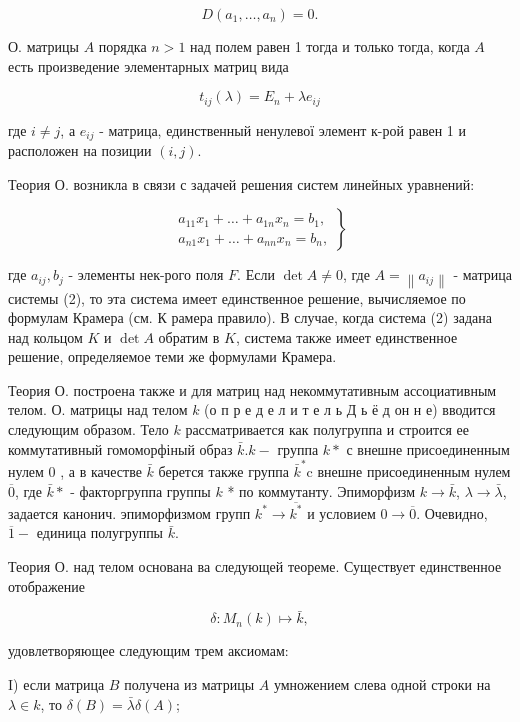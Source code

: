 \documentclass[10pt]{article}
\begin{document}
\[
D\left(a_{1}, \ldots, a_{n}\right)=0 .
\]

О. матрицы $A$ порядка $n>1$ над полем равен 1 тогда и только тогда, когда $A$ есть произведение элементарных матриц вида

\[
t_{i j}(\lambda)=E_{n}+\lambda e_{i j}
\]

где $i \neq j$, а $e_{i j}$ - матрица, единственный ненулевої элемент к-рой равен 1 и расположен на позиции $(i, j)$.

Теория О. возникла в связи с задачей решения систем линейных уравнений:

\[
\left.\begin{array}{c}
a_{11} x_{1}+\ldots+a_{1 n} x_{n}=b_{1}, \\
a_{n 1} x_{1}+\ldots+a_{n n} x_{n}=b_{n},
\end{array}\right\}
\]

где $a_{i j}, b_{j}$ - элементы нек-рого поля $F$. Если $\operatorname{det} A \neq 0$, где $A=\left\|a_{i j}\right\|$ - матрица системы (2), то эта система имеет единственное решение, вычисляемое по формулам Крамера (см. К рамера правило). В случае, когда система (2) задана над кольцом $K$ и $\operatorname{det} A$ обратим в $K$, система также имеет единственное решение, определяемое теми же формулами Крамера.

Теория О. построена также и для матриц над некоммутативным ассоциативным телом. О. матрицы над телом $k$ (о п р е д е л и т е л ь Д ь ё д он н е) вводится следующим образом. Тело $k$ рассматривается как полугруппа и строится ее коммутативный гомоморфіный образ $\bar{k} . k-$ группа $k *$ с внешне присоединенным нулем 0 , а в качестве $\bar{k}$ берется также группа $\bar{k}^{*} \mathrm{c}$ внешне присоединенным нулем $\overline{0}$, где $\bar{k} *$ - факторгруппа группы $k$ * по коммутанту. Эпиморфизм $k \rightarrow \bar{k}$, $\lambda \rightarrow \bar{\lambda}$, задается канонич. эпиморфизмом групп $k^{*} \rightarrow \overline{k^{*}}$ и условием $0 \rightarrow \overline{0}$. Очевидно, $\overline{1}-$ единица полугруппы $\bar{k}$.

Теория О. над телом основана ва следующей теореме. Существует единственное отображение

\[
\delta: M_{n}(k) \mapsto \bar{k},
\]

удовлетворяющее следующим трем аксиомам:

I) если матрица $B$ получена из матрицы $A$ умножением слева одной строки на $\lambda \in k$, то $\delta(B)=\bar{\lambda} \delta(A)$;
\end{document}
